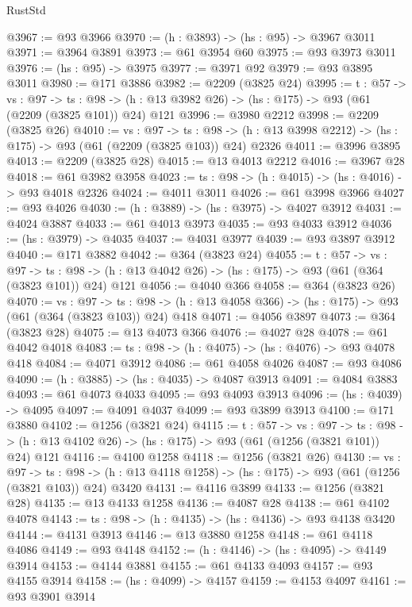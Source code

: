 \begin{lexlean}{RustStd}
\begin{coremodule}
@3967 := @93 @3966
@3970 := (h : @3893) -> (hs : @95) -> @3967 @3011
@3971 := @3964 @3891
@3973 := @61 @3954 @60
@3975 := @93 @3973 @3011
@3976 := (hs : @95) -> @3975
@3977 := @3971 @92
@3979 := @93 @3895 @3011
@3980 := @171 @3886
@3982 := @2209 (@3825 @24)
@3995 := {t : @57} ->
  {vs : @97} ->
  {ts : @98} -> (h : @13 @3982 @26) -> (hs : @175) -> @93 (@61 (@2209 (@3825 @101)) @24) @121
@3996 := @3980 @2212
@3998 := @2209 (@3825 @26)
@4010 := {vs : @97} ->
  {ts : @98} -> (h : @13 @3998 @2212) -> (hs : @175) -> @93 (@61 (@2209 (@3825 @103)) @24) @2326
@4011 := @3996 @3895
@4013 := @2209 (@3825 @28)
@4015 := @13 @4013 @2212
@4016 := @3967 @28
@4018 := @61 @3982 @3958
@4023 := {ts : @98} -> (h : @4015) -> (hs : @4016) -> @93 @4018 @2326
@4024 := @4011 @3011
@4026 := @61 @3998 @3966
@4027 := @93 @4026
@4030 := (h : @3889) -> (hs : @3975) -> @4027 @3912
@4031 := @4024 @3887
@4033 := @61 @4013 @3973
@4035 := @93 @4033 @3912
@4036 := (hs : @3979) -> @4035
@4037 := @4031 @3977
@4039 := @93 @3897 @3912
@4040 := @171 @3882
@4042 := @364 (@3823 @24)
@4055 := {t : @57} ->
  {vs : @97} ->
  {ts : @98} -> (h : @13 @4042 @26) -> (hs : @175) -> @93 (@61 (@364 (@3823 @101)) @24) @121
@4056 := @4040 @366
@4058 := @364 (@3823 @26)
@4070 := {vs : @97} ->
  {ts : @98} -> (h : @13 @4058 @366) -> (hs : @175) -> @93 (@61 (@364 (@3823 @103)) @24) @418
@4071 := @4056 @3897
@4073 := @364 (@3823 @28)
@4075 := @13 @4073 @366
@4076 := @4027 @28
@4078 := @61 @4042 @4018
@4083 := {ts : @98} -> (h : @4075) -> (hs : @4076) -> @93 @4078 @418
@4084 := @4071 @3912
@4086 := @61 @4058 @4026
@4087 := @93 @4086
@4090 := (h : @3885) -> (hs : @4035) -> @4087 @3913
@4091 := @4084 @3883
@4093 := @61 @4073 @4033
@4095 := @93 @4093 @3913
@4096 := (hs : @4039) -> @4095
@4097 := @4091 @4037
@4099 := @93 @3899 @3913
@4100 := @171 @3880
@4102 := @1256 (@3821 @24)
@4115 := {t : @57} ->
  {vs : @97} ->
  {ts : @98} -> (h : @13 @4102 @26) -> (hs : @175) -> @93 (@61 (@1256 (@3821 @101)) @24) @121
@4116 := @4100 @1258
@4118 := @1256 (@3821 @26)
@4130 := {vs : @97} ->
  {ts : @98} -> (h : @13 @4118 @1258) -> (hs : @175) -> @93 (@61 (@1256 (@3821 @103)) @24) @3420
@4131 := @4116 @3899
@4133 := @1256 (@3821 @28)
@4135 := @13 @4133 @1258
@4136 := @4087 @28
@4138 := @61 @4102 @4078
@4143 := {ts : @98} -> (h : @4135) -> (hs : @4136) -> @93 @4138 @3420
@4144 := @4131 @3913
@4146 := @13 @3880 @1258
@4148 := @61 @4118 @4086
@4149 := @93 @4148
@4152 := (h : @4146) -> (hs : @4095) -> @4149 @3914
@4153 := @4144 @3881
@4155 := @61 @4133 @4093
@4157 := @93 @4155 @3914
@4158 := (hs : @4099) -> @4157
@4159 := @4153 @4097
@4161 := @93 @3901 @3914

\end{coremodule}
\end{lexlean}
